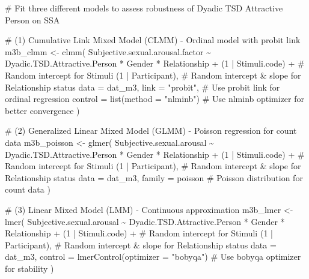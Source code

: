 \documentclass[
  bookmarksnumbered]{article}
\newenvironment{Shaded}{\begin{snugshade}}{\end{snugshade}}
\newcommand{\AttributeTok}[1]{\textcolor[rgb]{0.80,0.80,0.80}{#1}}
\newcommand{\CommentTok}[1]{\textcolor[rgb]{0.50,0.62,0.50}{#1}}
\newcommand{\DecValTok}[1]{\textcolor[rgb]{0.86,0.86,0.80}{#1}}
\newcommand{\FunctionTok}[1]{\textcolor[rgb]{0.94,0.94,0.56}{#1}}
\newcommand{\NormalTok}[1]{\textcolor[rgb]{0.80,0.80,0.80}{#1}}
\newcommand{\OtherTok}[1]{\textcolor[rgb]{0.94,0.94,0.56}{#1}}
\newcommand{\SpecialCharTok}[1]{\textcolor[rgb]{0.86,0.64,0.64}{#1}}
\newcommand{\StringTok}[1]{\textcolor[rgb]{0.80,0.58,0.58}{#1}}
\begin{document}
\begin{Shaded}
\begin{Highlighting}[]
\CommentTok{\# Fit three different models to assess robustness of Dyadic TSD Attractive Person on SSA}

\CommentTok{\# (1) Cumulative Link Mixed Model (CLMM) {-} Ordinal model with probit link}
\NormalTok{m3b\_clmm }\OtherTok{\textless{}{-}} \FunctionTok{clmm}\NormalTok{(}
\NormalTok{  Subjective.sexual.arousal.factor }\SpecialCharTok{\textasciitilde{}}\NormalTok{ Dyadic.TSD.Attractive.Person }\SpecialCharTok{*}\NormalTok{ Gender }\SpecialCharTok{*}\NormalTok{ Relationship }\SpecialCharTok{+}
\NormalTok{    (}\DecValTok{1} \SpecialCharTok{|}\NormalTok{ Stimuli.code) }\SpecialCharTok{+} \CommentTok{\# Random intercept for Stimuli}
\NormalTok{    (}\DecValTok{1} \SpecialCharTok{|}\NormalTok{ Participant), }\CommentTok{\# Random intercept \& slope for Relationship status}
  \AttributeTok{data =}\NormalTok{ dat\_m3,}
  \AttributeTok{link =} \StringTok{"probit"}\NormalTok{, }\CommentTok{\# Use probit link for ordinal regression}
  \AttributeTok{control =} \FunctionTok{list}\NormalTok{(}\AttributeTok{method =} \StringTok{"nlminb"}\NormalTok{) }\CommentTok{\# Use \textquotesingle{}nlminb\textquotesingle{} optimizer for better convergence}
\NormalTok{)}

\CommentTok{\# (2) Generalized Linear Mixed Model (GLMM) {-} Poisson regression for count data}
\NormalTok{m3b\_poisson }\OtherTok{\textless{}{-}} \FunctionTok{glmer}\NormalTok{(}
\NormalTok{  Subjective.sexual.arousal }\SpecialCharTok{\textasciitilde{}}\NormalTok{ Dyadic.TSD.Attractive.Person }\SpecialCharTok{*}\NormalTok{ Gender }\SpecialCharTok{*}\NormalTok{ Relationship }\SpecialCharTok{+}
\NormalTok{    (}\DecValTok{1} \SpecialCharTok{|}\NormalTok{ Stimuli.code) }\SpecialCharTok{+} \CommentTok{\# Random intercept for Stimuli}
\NormalTok{    (}\DecValTok{1} \SpecialCharTok{|}\NormalTok{ Participant), }\CommentTok{\# Random intercept \& slope for Relationship status}
  \AttributeTok{data =}\NormalTok{ dat\_m3,}
  \AttributeTok{family =}\NormalTok{ poisson }\CommentTok{\# Poisson distribution for count data}
\NormalTok{)}

\CommentTok{\# (3) Linear Mixed Model (LMM) {-} Continuous approximation}
\NormalTok{m3b\_lmer }\OtherTok{\textless{}{-}} \FunctionTok{lmer}\NormalTok{(}
\NormalTok{  Subjective.sexual.arousal }\SpecialCharTok{\textasciitilde{}}\NormalTok{ Dyadic.TSD.Attractive.Person }\SpecialCharTok{*}\NormalTok{ Gender }\SpecialCharTok{*}\NormalTok{ Relationship }\SpecialCharTok{+}
\NormalTok{    (}\DecValTok{1} \SpecialCharTok{|}\NormalTok{ Stimuli.code) }\SpecialCharTok{+} \CommentTok{\# Random intercept for Stimuli}
\NormalTok{    (}\DecValTok{1} \SpecialCharTok{|}\NormalTok{ Participant), }\CommentTok{\# Random intercept \& slope for Relationship status}
  \AttributeTok{data =}\NormalTok{ dat\_m3,}
  \AttributeTok{control =} \FunctionTok{lmerControl}\NormalTok{(}\AttributeTok{optimizer =} \StringTok{"bobyqa"}\NormalTok{) }\CommentTok{\# Use \textquotesingle{}bobyqa\textquotesingle{} optimizer for stability}
\NormalTok{)}
\end{Highlighting}
\end{Shaded}
\end{document}
